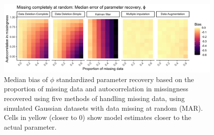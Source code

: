 \documentclass{article}
\begin{document}
\begin{figure}
    \noindent\includegraphics[width = \textwidth]{Figures/MockedUpFigures/heatmap_GaussianMCAR_justPhi.png}
    \caption{Median bias of $\phi$ standardized parameter recovery based on the proportion of missing data and autocorrelation in missingness recovered using five methods of handling missing data, using simulated Gaussian datasets with data missing at random (MAR). Cells in yellow (closer to 0) show model estimates closer to the actual parameter.}
    \label{fig:heatMap_gauss_MAR}
\end{figure}
\end{document}
